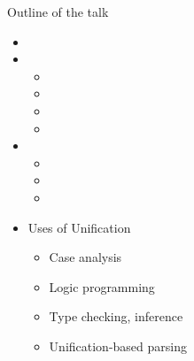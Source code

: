 \documentclass[pdf,fyma2]{prosper} %
\begin{document}
\begin{slide}{Outline of the talk}
	\begin{itemize}
	\item {}
	\item {}
	    \begin{itemize}
    	\item {}
    	\item {}
    	\item {}
    	\item {}
    	\end{itemize}
	\item {}
	    \begin{itemize}
    	\item {}
    	\item {}
    	\item {}
    	\end{itemize}
	\item Uses of Unification
	    \begin{itemize}
    	\item Case analysis
    	\item Logic programming
    	\item Type checking, inference
    	\item Unification-based parsing
    	\end{itemize}
	\end{itemize}
\end{slide}
\end{document}
